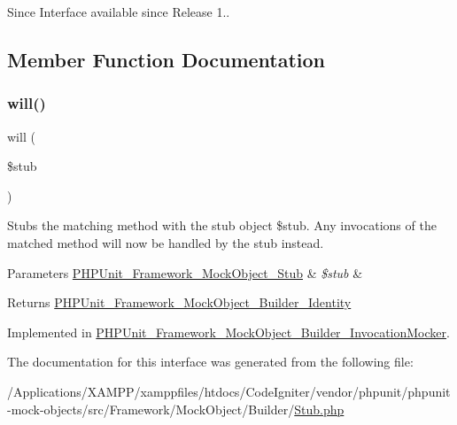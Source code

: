 \begin{DoxySince}{Since}
Interface available since Release 1.. 
\end{DoxySince}


\subsection{Member Function Documentation}
\mbox{\label{interface_p_h_p_unit___framework___mock_object___builder___stub_a0ca62ef89f1b4b06709f6db190ebbf58}} 
\subsubsection{\texorpdfstring{will()}{will()}}
{\footnotesize\ttfamily will (\begin{DoxyParamCaption}\item[{\mbox{\hyperlink{interface_p_h_p_unit___framework___mock_object___stub}{P\+H\+P\+Unit\+\_\+\+Framework\+\_\+\+Mock\+Object\+\_\+\+Stub}}}]{\$stub }\end{DoxyParamCaption})}

Stubs the matching method with the stub object \$stub. Any invocations of the matched method will now be handled by the stub instead.


\begin{DoxyParams}[1]{Parameters}
\mbox{\hyperlink{interface_p_h_p_unit___framework___mock_object___stub}{P\+H\+P\+Unit\+\_\+\+Framework\+\_\+\+Mock\+Object\+\_\+\+Stub}} & {\em \$stub} & \\
\hline
\end{DoxyParams}
\begin{DoxyReturn}{Returns}
\mbox{\hyperlink{interface_p_h_p_unit___framework___mock_object___builder___identity}{P\+H\+P\+Unit\+\_\+\+Framework\+\_\+\+Mock\+Object\+\_\+\+Builder\+\_\+\+Identity}} 
\end{DoxyReturn}


Implemented in \mbox{\hyperlink{class_p_h_p_unit___framework___mock_object___builder___invocation_mocker_a0ca62ef89f1b4b06709f6db190ebbf58}{P\+H\+P\+Unit\+\_\+\+Framework\+\_\+\+Mock\+Object\+\_\+\+Builder\+\_\+\+Invocation\+Mocker}}.



The documentation for this interface was generated from the following file\+:\begin{DoxyCompactItemize}
\item 
/\+Applications/\+X\+A\+M\+P\+P/xamppfiles/htdocs/\+Code\+Igniter/vendor/phpunit/phpunit-\/mock-\/objects/src/\+Framework/\+Mock\+Object/\+Builder/\mbox{\hyperlink{_builder_2_stub_8php}{Stub.\+php}}\end{DoxyCompactItemize}
